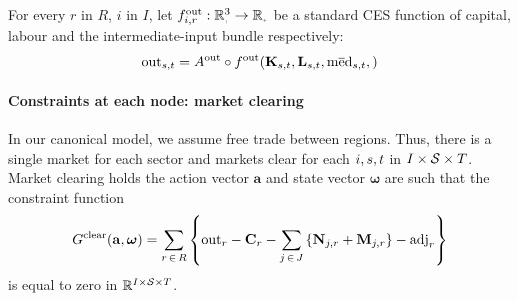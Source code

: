 \documentclass[12pt,a4paper,twoside, draft]{article}
\begin{document}
For every $r$ in $R$, $i$ in $I$, let
$f_{i, r}^{\textup{out}}: \nnreal^{3} \rightarrow \nnreal$ be a standard
CES function of capital, labour and the intermediate-input bundle %
respectively:
\begin{equation}
	\textup{out}_{{s}, t}
    = A^{\textup{out}} \circ f ^ \textup{out}(
        \mathbf{K}_{{s}, t},
        \mathbf{L}_{{s}, t},
        \textup{m}\overline{\textup{e}}\textup{d}_{{s}, t},
        )
\end{equation}
\paragraph{Constraints at each node: market clearing}
In our canonical model, we assume free trade between regions.
Thus, there is a single market for each sector and markets clear for each
$i, {s}, t $ in $I \times \mathcal{S} \times T$.
Market clearing holds the action vector $\mathbf{a}$ and state vector
$\boldsymbol{\omega}$ are such that the constraint function
\begin{equation}\label{eq-market-clearing}
  G^{\textup{clear}}(\mathbf{a}, \boldsymbol{\omega}) =
  \sum_{r \,\in\, R} \left\{
  \textup{out}_{r}
  - \mathbf{C}_{r}
  - \sum_{j \,\in\, J}
      \left\{\mathbf{N}_{j, r} + \mathbf{M}_{j, r}\right\}
  - \textup{adj}_{r} \right\}
\end{equation}
is equal to zero in $\mathbb R^{I \times  \mathcal{S} \times T}$.
\end{document}
